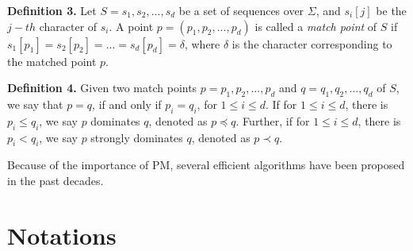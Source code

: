 \documentclass{article}
\begin{document}
\textbf{Definition 3.} Let $S = {s_1, s_2, ..., s_d}$ be a set of
sequences over $\Sigma$, and $s_i[j]$ be the $j-th$ character of
$s_i$. A point $p = (p_1, p_2, ..., p_d)$ is called a \emph{match
point} of $S$ if $s_1[p_1] = s_2[p_2] = ... = s_d[p_d] = \delta$,
where $\delta$ is the character corresponding to the matched point
$p$.


\textbf{Definition 4.} Given two match points $p = {p_1, p_2, ...,
p_d}$ and $q = {q_1, q_2, ..., q_d}$ of $S$, we say that $p = q$, if
and only if $p_i = q_i$, for $1 \leq i \leq d$.  If for $1 \leq i \leq
d$, there is $p_i \leq q_i$, we say $p$ dominates $q$, denoted as $p
\preceq q$. Further, if for $1 \leq i \leq d$, there is $p_i < q_i$,
we say $p$ strongly dominates $q$, denoted as $p \prec q$.



Because of the importance of PM, several efficient algorithms have
been proposed in the past decades.

\section{Notations}
\label{sec:notations}
\end{document}
